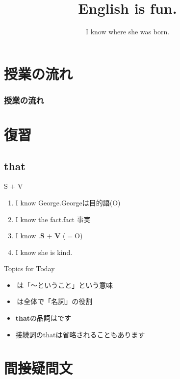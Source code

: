 \documentclass[aspectratio=169,xcolor={dvipsnames,table}]{beamer}
\title{English is fun.}
\subtitle{I know where she was born.}
\author{}
\institute[]{}
\date[]
\begin{document}
\begin{frame}[plain]
  \titlepage
\end{frame}


\section*{授業の流れ}
\begin{frame}[plain]
  \frametitle{授業の流れ}
  \tableofcontents
\end{frame}

\section{復習}
\subsection{that}
\begin{frame}[plain]{S $+$ V }
\Large
\begin{enumerate}
 \item I know George.\hfill{\scriptsize Georgeは目的語(O)}
 \item I know the fact.\hfill{\scriptsize fact  事実}
 \item I know .\hfill{}{\small \textbf{S} $+$ \textbf{V} ($=$O)}
 \item I know she is kind.

\end{enumerate}
\mbox{}\hfill{\scriptsize {}}

\begin{block}{Topics for Today}\small
\begin{itemize}[square]\small
 \item   {}\,は「〜ということ」という意味
 \item   {}\,は全体で「名詞」の役割
 \item  \textbf{that}の品詞はです
 \item 接続詞のthatは省略されることもあります
\end{itemize}
     \end{block}
\end{frame}
\section{間接疑問文}
\end{document}
